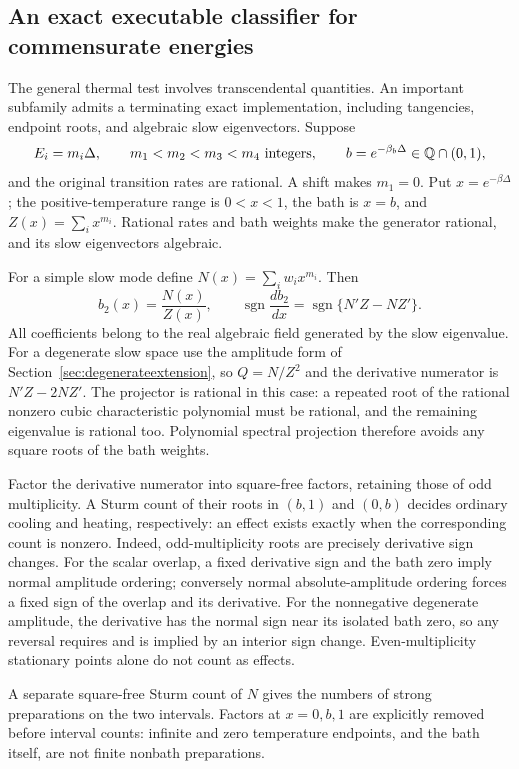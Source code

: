 \subsection{An exact executable classifier for commensurate energies}\label{sec:exactclassifier}
The general thermal test involves transcendental quantities. An important
subfamily admits a terminating exact implementation, including tangencies,
endpoint roots, and algebraic slow eigenvectors. Suppose
\[
E_i=m_i\Delta,\qquad m_1<m_2<m_3<m_4\ \hbox{integers},\qquad
b=e^{-\beta_b\Delta}\in\mathbb Q\cap(0,1),
\]
and the original transition rates are rational. A shift makes $m_1=0$.
Put $x=e^{-\beta\Delta}$; the positive-temperature range is $0<x<1$,
the bath is $x=b$, and $Z(x)=\sum_i x^{m_i}$. Rational rates and bath
weights make the generator rational, and its slow eigenvectors algebraic.

For a simple slow mode define $N(x)=\sum_iw_i x^{m_i}$. Then
\[
b_2(x)=\frac{N(x)}{Z(x)},\qquad
\operatorname{sgn}\frac{db_2}{dx}
=\operatorname{sgn}\{N'Z-NZ'\}.
\]
All coefficients belong to the real algebraic field generated by the slow
eigenvalue. For a degenerate slow space use the amplitude form of
Section~\ref{sec:degenerateextension}, so $Q=N/Z^2$ and the derivative
numerator is $N'Z-2NZ'$. The projector is rational in this case: a repeated
root of the rational nonzero cubic characteristic polynomial must be
rational, and the remaining eigenvalue is rational too. Polynomial spectral
projection therefore avoids any square roots of the bath weights.

Factor the derivative numerator into square-free factors, retaining those
of odd multiplicity. A Sturm count of their roots in $(b,1)$ and $(0,b)$
decides ordinary cooling and heating, respectively: an effect exists exactly
when the corresponding count is nonzero. Indeed, odd-multiplicity roots are
precisely derivative sign changes. For the scalar overlap, a fixed derivative
sign and the bath zero imply normal amplitude ordering; conversely normal
absolute-amplitude ordering forces a fixed sign of the overlap and its
derivative. For the nonnegative degenerate amplitude, the derivative has
the normal sign near its isolated bath zero, so any reversal requires and
is implied by an interior sign change. Even-multiplicity stationary points
alone do not count as effects.

A separate square-free Sturm count of $N$ gives the numbers of strong
preparations on the two intervals. Factors at $x=0,b,1$ are explicitly
removed before interval counts: infinite and zero temperature endpoints,
and the bath itself, are not finite nonbath preparations.

